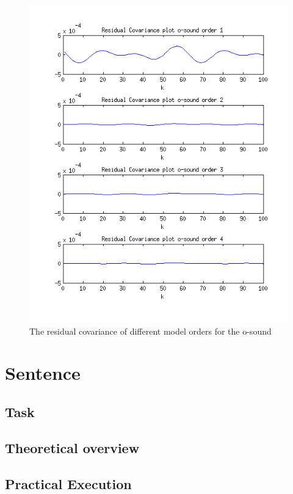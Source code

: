 \documentclass[12pt]{article}
\begin{document}
\begin{figure}[H]
  \centering
  \includegraphics[width=14cm]{residual_covariance_o.png}
  \caption{The residual covariance of different model orders for the o-sound}
\end{figure}

\section{Sentence}

\subsection{Task}

\subsection{Theoretical overview}

\subsection{Practical Execution}
\end{document}
